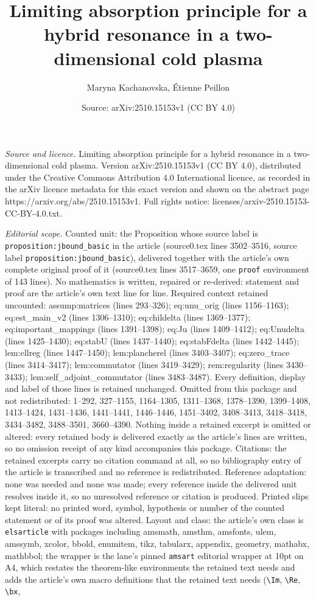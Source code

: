 \documentclass[10pt,a4paper]{amsart}
\title[Limiting absorption principle for a hybrid resonance in a tw]{Limiting absorption principle for a hybrid resonance in a two-dimensional cold plasma}
\author{Maryna Kachanovska, \'Etienne Peillon}
\date{Source: arXiv:2510.15153v1 (CC BY 4.0)}
\begin{document}
\maketitle

\noindent\emph{Source and licence.} Limiting absorption principle for a hybrid resonance in a two-dimensional cold plasma. Version arXiv:2510.15153v1 (CC BY 4.0), distributed under the Creative Commons Attribution 4.0 International licence, as recorded in the arXiv licence metadata for this exact version and shown on the abstract page https://arxiv.org/abs/2510.15153v1. Full rights notice: licenses/arxiv-2510.15153-CC-BY-4.0.txt.\par\smallskip

\noindent\textit{Editorial scope.} Counted unit: the Proposition whose source label is \texttt{proposition:jbound\_basic} in the article (source0.tex lines 3502--3516, source label \texttt{proposition:jbound\_basic}), delivered together with the article's own complete original proof of it (source0.tex lines 3517--3659, one \texttt{proof} environment of 143 lines). No mathematics is written, repaired or re-derived: statement and proof are the article's own text line for line. Required context retained uncounted: assump:matrices (lines 293--326); eq:unu\_orig (lines 1156--1163); eq:est\_main\_v2 (lines 1306--1310); eq:childelta (lines 1369--1377); eq:important\_mappings (lines 1391--1398); eq:Ju (lines 1409--1412); eq:Unudelta (lines 1425--1430); eq:stabU (lines 1437--1440); eq:stabFdelta (lines 1442--1445); lem:ellreg (lines 1447--1450); lem:plancherel (lines 3403--3407); eq:zero\_trace (lines 3414--3417); lem:commutator (lines 3419--3429); rem:regularity (lines 3430--3433); lem:self\_adjoint\_commutator (lines 3483--3487). Every definition, display and label of those lines is retained unchanged. Omitted from this package and not redistributed: 1--292, 327--1155, 1164--1305, 1311--1368, 1378--1390, 1399--1408, 1413--1424, 1431--1436, 1441--1441, 1446--1446, 1451--3402, 3408--3413, 3418--3418, 3434--3482, 3488--3501, 3660--4390. Nothing inside a retained excerpt is omitted or altered: every retained body is delivered exactly as the article's lines are written, so no omission receipt of any kind accompanies this package. Citations: the retained excerpts carry no citation command at all, so no bibliography entry of the article is transcribed and no reference is redistributed. Reference adaptation: none was needed and none was made; every reference inside the delivered unit resolves inside it, so no unresolved reference or citation is produced. Printed slips kept literal: no printed word, symbol, hypothesis or number of the counted statement or of its proof was altered. Layout and class: the article's own class is \texttt{elsarticle} with packages including amsmath, amsthm, amsfonts, ulem, amssymb, xcolor, bbold, enumitem, tikz, tabularx, appendix, geometry, mathabx, mathbbol; the wrapper is the lane's pinned \texttt{amsart} editorial wrapper at 10pt on A4, which restates the theorem-like environments the retained text needs and adds the article's own macro definitions that the retained text needs (\texttt{\textbackslash Im}, \texttt{\textbackslash Re}, \texttt{\textbackslash bx}, 
\end{document}
